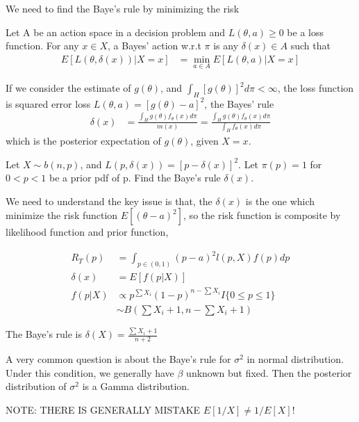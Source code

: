 We need to find the Baye's rule by minimizing the risk

\begin{Definition}
Let A be an action space in a decision problem and $L(\theta, a) \geq 0$ be a loss function. For any $x \in X$, a Bayes' action w.r.t $\pi$ is any $\delta(x) \in A$ such that
 \begin{align*}
E [L(\theta, \delta(x)) | X= x]&= \underset{a \in A}{\min} E[L(\theta, a) | X = x] 
\end{align*}

If we consider the estimate of $g(\theta)$, and $\int_{H} [g(\theta)]^2 d\pi < \infty$, the loss function is squared error loss $L(\theta, a) = [g(\theta) -a]^2$, the Bayes' rule
 \begin{align*}
\delta(x) &= \frac{\int_{H} g(\theta) f_{\theta}(x) d\pi}{m(x)} = \frac{\int_{H} g(\theta) f_{\theta}(x) d\pi}{\int_{H} f_{\theta}(x) d\pi}
\end{align*}
which is the posterior expectation of $g(\theta)$, given $X = x$.
\end{Definition}

\begin{Example}
Let $X \sim b(n, p)$, and $L(p, \delta(x)) = [p- \delta(x)]^2$. Let $\pi(p) = 1$ for $0< p<1$ be a prior pdf of p. Find the Baye's rule $\delta(x)$.

We need to understand the key issue is that, the $\delta(x)$ is the one which minimize the risk function $E[(\theta - a)^2]$, so the risk function is composite by likelihood function and prior function,

 \begin{align*}
R_{T}(p)&= \int_{p \in (0,1)} (p - a)^2 l(p, X) f(p) dp \\
\delta(x) &=  E [f(p | X)] \\
f(p |X) & \propto p^{\sum X_i} (1- p)^{n- \sum X_i} I \{ 0 \leq p \leq 1\}\\
& \sim B(\sum X_i + 1, n- \sum X_i + 1)
\end{align*}

The Baye's rule is $\delta(X) = \frac{\sum X_i + 1}{n+2}$

\end{Example}

A very common question is about the Baye's rule for $\sigma^2$ in normal distribution. Under this condition, we generally have $\beta$ unknown but fixed. Then the posterior distribution of $\sigma^2$ is a Gamma distribution. 

NOTE: THERE IS GENERALLY MISTAKE $E[1/X] \neq 1/E[X]$!

